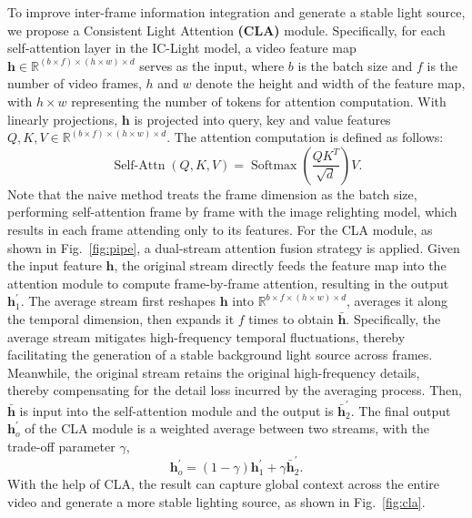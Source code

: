 To improve inter-frame information integration and generate a stable light source,
we propose a Consistent Light Attention \textbf{(CLA)} module.
Specifically, for each self-attention layer in the IC-Light model, 
a video feature map $\mathbf{h} \in \mathbb{R}^{(b \times f) \times (h \times w) \times d}$ serves as 
the input, where $b$ is the batch size and $f$ is the number of video frames, $h$ and $w$ denote the height and width of the feature map, 
with $h \times w$ representing the number of tokens for attention computation.
With linearly projections, $\mathbf{h}$ is projected into query, 
key and value features $Q, K, V \in \mathbb{R}^{ (b \times f) \times (h \times w) \times d}$.
The attention computation is defined as follows:
\begin{equation}
\operatorname{Self-Attn}(Q, K, V)=\operatorname{Softmax}\left(\frac{Q K^T}{\sqrt{d}}\right) V.
\end{equation}
Note that the naive method treats the frame dimension as the batch size, 
performing self-attention frame by frame with the image relighting model, 
which results in each frame attending only to its features.
For the CLA module, as shown in Fig.~\ref{fig:pipe},
a dual-stream attention fusion strategy is applied.
Given the input feature $\mathbf{h}$, the original stream directly feeds the feature map into the attention module to 
compute frame-by-frame attention, resulting in the output $\mathbf{h}^{\prime}_1$.
The average stream first reshapes $\mathbf{h}$ into $ \mathbb{R}^{b \times f \times (h \times w) \times d}$, averages
it along the temporal dimension, then expands it $f$ times to obtain $\mathbf{\bar{h}}$.
Specifically, the average stream mitigates high-frequency temporal fluctuations,
thereby facilitating the generation of a stable background light source across frames.
Meanwhile, the original stream
retains the original high-frequency details, 
thereby compensating for the detail loss incurred by the averaging process.
Then,
$\mathbf{\bar{h}}$ is input into the self-attention module and the output is $\mathbf{\bar{h}}^{\prime}_2$.
The final output $\mathbf{h}_o^{\prime}$ of the CLA module is a weighted average between two streams, with the trade-off parameter $\gamma$,
\begin{equation}\label{eq:attn_fusion}
\mathbf{h}_o^{\prime} = (1-\gamma) \mathbf{h}^{\prime}_1 + \gamma \mathbf{\bar{h}}^{\prime}_2.
\end{equation}
With the help of CLA, 
the result can capture global context across the entire video
and generate a more stable lighting source, as shown in Fig.~\ref{fig:cla}.

